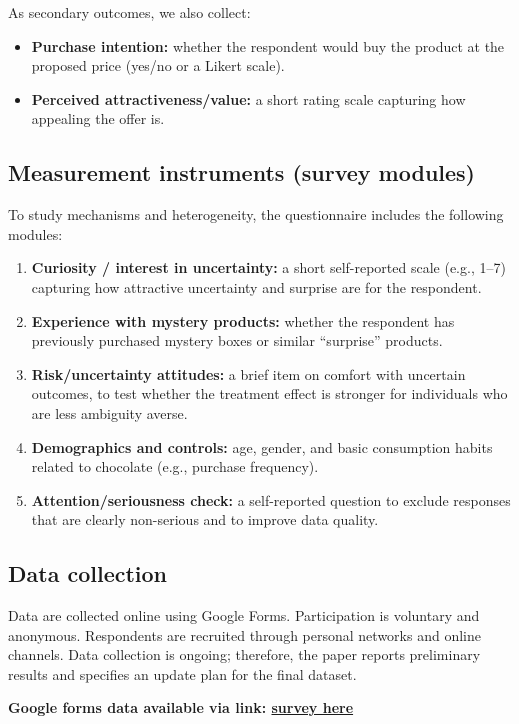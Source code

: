 \documentclass{article}
\begin{document}
As secondary outcomes, we also collect:
\begin{itemize}
    \item \textbf{Purchase intention:} whether the respondent would buy the product at the proposed price (yes/no or a Likert scale).
    \item \textbf{Perceived attractiveness/value:} a short rating scale capturing how appealing the offer is.
\end{itemize}

\subsection{Measurement instruments (survey modules)}
To study mechanisms and heterogeneity, the questionnaire includes the following modules:

\begin{enumerate}
    \item \textbf{Curiosity / interest in uncertainty:} a short self-reported scale (e.g., 1--7) capturing how attractive uncertainty and surprise are for the respondent.
    \item \textbf{Experience with mystery products:} whether the respondent has previously purchased mystery boxes or similar ``surprise'' products.
    \item \textbf{Risk/uncertainty attitudes:} a brief item on comfort with uncertain outcomes, to test whether the treatment effect is stronger for individuals who are less ambiguity averse.
    \item \textbf{Demographics and controls:} age, gender, and basic consumption habits related to chocolate (e.g., purchase frequency).
    \item \textbf{Attention/seriousness check:} a self-reported question to exclude responses that are clearly non-serious and to improve data quality.
\end{enumerate}

\subsection{Data collection}
Data are collected online using Google Forms. Participation is voluntary and anonymous. Respondents are recruited through personal networks and online channels. Data collection is ongoing; therefore, the paper reports preliminary results and specifies an update plan for the final dataset.

\textbf{Google forms data available via link: \href{https://docs.google.com/forms/d/122MpbeAqy2UZnPNfvmIfCLsXft0xn2-Y7mvj-3ezgEI/edit#responses}{survey here}}
\end{document}
